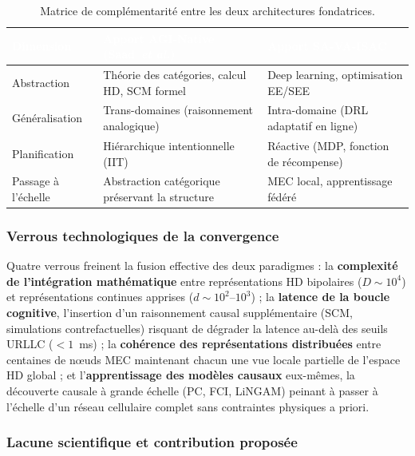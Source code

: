\documentclass[12pt,a4paper,titlepage]{article}
\newcommand{\hd}[1]{\textcolor{white}{\textbf{#1}}}
\begin{document}
\begin{table}[H]
    \centering
    \caption{Matrice de complémentarité entre les deux architectures fondatrices.}
    \label{tab:complementarity}
    \begin{tabularx}{\textwidth}{F{3cm}LL}
        \toprule
        \hd{Dimension} & \hd{Apport AGI-Native (Saad~\textit{et al.})} & \hd{Apport SA-VA-ISAC} \\
        \midrule
        Abstraction & Théorie des catégories, calcul HD, SCM formel & Deep learning, optimisation EE/SEE \\
        Généralisation & Trans-domaines (raisonnement analogique) & Intra-domaine (DRL adaptatif en ligne) \\
        Planification & Hiérarchique intentionnelle (IIT) & Réactive (MDP, fonction de récompense) \\
        Passage à l'échelle & Abstraction catégorique préservant la structure & MEC local, apprentissage fédéré \\
        \bottomrule
    \end{tabularx}
\end{table}

\subsubsection{Verrous technologiques de la convergence}

Quatre verrous freinent la fusion effective des deux paradigmes : la \textbf{complexité de l'intégration mathématique} entre représentations HD bipolaires ($D\sim10^4$) et représentations continues apprises ($d\sim10^2$--$10^3$) ; la \textbf{latence de la boucle cognitive}, l'insertion d'un raisonnement causal supplémentaire (SCM, simulations contrefactuelles) risquant de dégrader la latence au-delà des seuils URLLC ($<1$~ms) ; la \textbf{cohérence des représentations distribuées} entre centaines de n\oe uds MEC maintenant chacun une vue locale partielle de l'espace HD global ; et l'\textbf{apprentissage des modèles causaux} eux-mêmes, la découverte causale à grande échelle (PC, FCI, LiNGAM) peinant à passer à l'échelle d'un réseau cellulaire complet sans contraintes physiques a priori.

\subsubsection{Lacune scientifique et contribution proposée}
\end{document}
